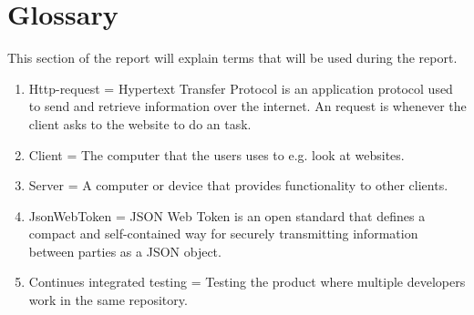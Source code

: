 \documentclass[paper=a4, fontsize=11pt,twoside]{scrartcl}	%
\begin{document}
\section{Glossary}
This section of the report will explain terms that will be used during the report. 
\begin{enumerate}
\item Http-request = Hypertext Transfer Protocol is an application protocol used to send and retrieve information over the internet. An request is whenever the client asks to the website to do an task.
\item Client = The computer that the users uses to e.g. look at websites.
\item Server = A computer or device that provides functionality to other clients.
\item JsonWebToken = JSON Web Token is an open standard that defines a compact and self-contained way for securely transmitting information between parties as a JSON object.
\item Continues integrated testing = Testing the product where multiple developers work in the same repository.
\end{enumerate}


\newpage
\end{document}
